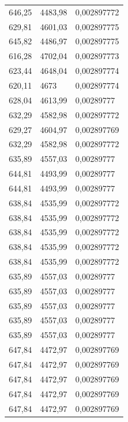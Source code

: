 \begin{center}
\begin{longtable}{|l|l|l|}
646,25            & 4483,98           & 0,002897772 \\
629,81            & 4601,03           & 0,002897775 \\
645,82            & 4486,97           & 0,002897775 \\
616,28            & 4702,04           & 0,002897773 \\
623,44            & 4648,04           & 0,002897774 \\
620,11            & 4673              & 0,002897774 \\
628,04            & 4613,99           & 0,00289777  \\
632,29            & 4582,98           & 0,002897772 \\
629,27            & 4604,97           & 0,002897769 \\
632,29            & 4582,98           & 0,002897772 \\
635,89            & 4557,03           & 0,00289777  \\
644,81            & 4493,99           & 0,00289777  \\
644,81            & 4493,99           & 0,00289777  \\
638,84            & 4535,99           & 0,002897772 \\
638,84            & 4535,99           & 0,002897772 \\
638,84            & 4535,99           & 0,002897772 \\
638,84            & 4535,99           & 0,002897772 \\
638,84            & 4535,99           & 0,002897772 \\
635,89            & 4557,03           & 0,00289777  \\
635,89            & 4557,03           & 0,00289777  \\
635,89            & 4557,03           & 0,00289777  \\
635,89            & 4557,03           & 0,00289777  \\
635,89            & 4557,03           & 0,00289777  \\
647,84            & 4472,97           & 0,002897769 \\
647,84            & 4472,97           & 0,002897769 \\
647,84            & 4472,97           & 0,002897769 \\
647,84            & 4472,97           & 0,002897769 \\
647,84            & 4472,97           & 0,002897769 \\

\end{longtable}
\end{center}
